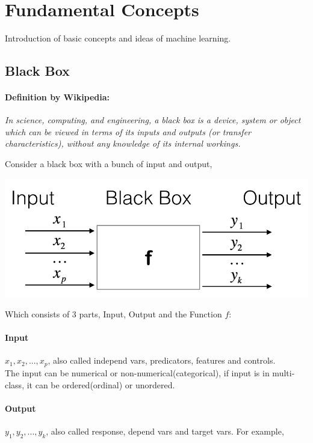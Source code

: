 \documentclass{article}
\begin{document}
\section{Fundamental Concepts}{
    Introduction of basic concepts and ideas of machine learning.
    \subsection{Black Box}{
        \paragraph{Definition by Wikipedia:}{
            \textit{In science, computing, and engineering, a black box is a device, system or object which can be viewed in terms of its inputs and outputs (or transfer characteristics), without any knowledge of its internal workings.}\\
        }
        
        Consider a black box with a bunch of input and output,

        \begin{center}{
            \includegraphics[scale=0.5]{blackbox.png}
        }
        \end{center}

        Which consists of 3 parts, Input, Output and the Function $f$:
        
        \paragraph{Input}{
            $x_1,x_2,...,x_p$, also called independ vars, predicators, features and controls.\\
            The input can be numerical or non-numerical(categorical), if input is in multi-class, it can be ordered(ordinal) or unordered.
        }

        \paragraph{Output}{
            $y_1,y_2,...,y_k$, also called response, depend vars and target vars. For example,

}}}
\end{document}
